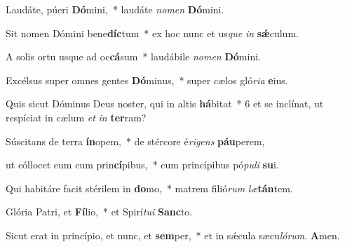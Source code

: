 \item Laudáte, púeri \textbf{Dó}mini,~* laudáte \textit{no}\textit{men} \textbf{Dó}mini.

\item Sit nomen Dómini bene\textbf{díc}tum~* ex hoc nunc et us\textit{que} \textit{in} \textbf{sǽ}culum.

\item A solis ortu usque ad oc\textbf{cá}sum~* laudábile \textit{no}\textit{men} \textbf{Dó}mini.

\item Excélsus super omnes gentes \textbf{Dó}minus,~* super cælos gló\textit{ri}\textit{a} \textbf{e}ius.

\item Quis sicut Dóminus Deus noster, qui in altis \textbf{há}bitat~* 6 et se inclínat, ut respíciat in cælum \textit{et} \textit{in} \textbf{ter}ram?

\item Súscitans de terra \textbf{ín}opem,~* de stércore é\textit{ri}\textit{gens} \textbf{páu}perem,

\item ut cóllocet eum cum prin\textbf{cí}pibus,~* cum princípibus pó\textit{pu}\textit{li} \textbf{su}i.

\item Qui habitáre facit stérilem in \textbf{do}mo,~* matrem filió\textit{rum} \textit{læ}\textbf{tán}tem.

\item Glória Patri, et \textbf{Fí}lio,~* et Spirí\textit{tu}\textit{i} \textbf{Sanc}to.

\item Sicut erat in princípio, et nunc, et \textbf{sem}per,~* et in sǽcula sæcu\textit{ló}\textit{rum}. \textbf{A}men.